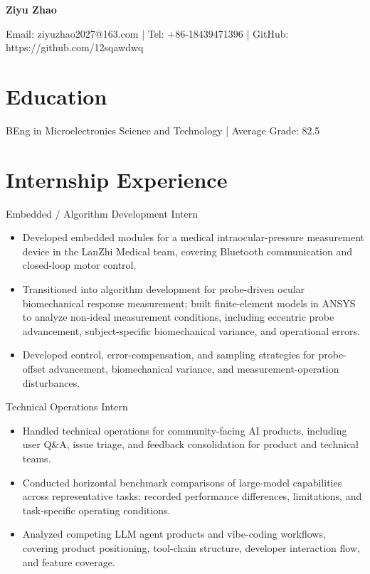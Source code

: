 \documentclass[9pt,letterpaper]{article}
\newcommand{\entry}[1]{\vspace{1.6pt}{\bfseries #1}\vspace{0.3pt}}
\begin{document}
\begin{center}{\Large\bfseries Ziyu Zhao}\end{center}\vspace{-5pt}
\begin{center}\footnotesize Email: ziyuzhao2027@163.com | Tel: +86-18439471396 | GitHub: https://github.com/12sqawdwq\end{center}\vspace{-4pt}
\section*{Education}
\entry{Xi'an Jiaotong-Liverpool University | Sep 2023 - Present}
BEng in Microelectronics Science and Technology | Average Grade: 82.5\\
\section*{Internship Experience}
\entry{Shenzhen InnoX Academy | Jul 2025 - Present}
Embedded / Algorithm Development Intern\\
\begin{itemize}
\item Developed embedded modules for a medical intraocular-pressure measurement device in the LanZhi Medical team, covering Bluetooth communication and closed-loop motor control.
\item Transitioned into algorithm development for probe-driven ocular biomechanical response measurement; built finite-element models in ANSYS to analyze non-ideal measurement conditions, including eccentric probe advancement, subject-specific biomechanical variance, and operational errors.
\item Developed control, error-compensation, and sampling strategies for probe-offset advancement, biomechanical variance, and measurement-operation disturbances.
\end{itemize}
\entry{ByteDance Volcano Engine Data Department | Dec 2025 - May 2026}
Technical Operations Intern\\
\begin{itemize}
\item Handled technical operations for community-facing AI products, including user Q\&A, issue triage, and feedback consolidation for product and technical teams.
\item Conducted horizontal benchmark comparisons of large-model capabilities across representative tasks; recorded performance differences, limitations, and task-specific operating conditions.
\item Analyzed competing LLM agent products and vibe-coding workflows, covering product positioning, tool-chain structure, developer interaction flow, and feature coverage.
\end{itemize}
\end{document}
